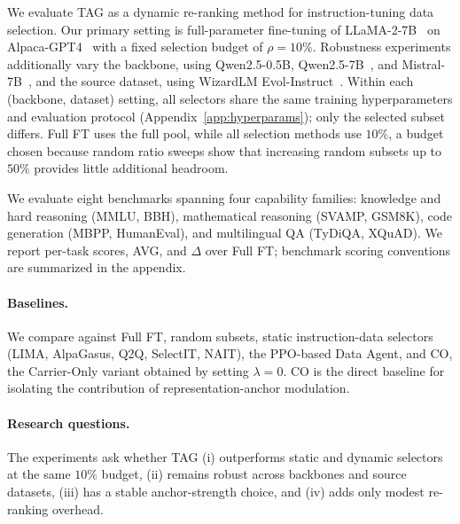 We evaluate \textsc{TAG} as a dynamic re-ranking method for
instruction-tuning data selection. Our primary setting is
full-parameter fine-tuning of LLaMA-2-7B~\cite{touvron2023llama2} on
Alpaca-GPT4~\cite{wang2023selfinstruct} with a fixed selection budget
of \(\rho{=}10\%\). Robustness experiments additionally vary the
backbone, using Qwen2.5-0.5B, Qwen2.5-7B~\cite{qwen2025technical},
and Mistral-7B~\cite{jiang2023mistral}, and the source dataset, using
WizardLM Evol-Instruct~\cite{xu2024wizardlm}. Within each
(backbone, dataset) setting, all selectors share the same training
hyperparameters and evaluation protocol
(Appendix~\ref{app:hyperparams}); only the selected subset
differs. Full FT uses the full pool, while all selection methods use
\(10\%\), a budget chosen because random ratio sweeps show that
increasing random subsets up to \(50\%\) provides little additional
headroom.

We evaluate eight benchmarks spanning four capability families:
knowledge and hard reasoning (MMLU, BBH), mathematical reasoning
(SVAMP, GSM8K), code generation (MBPP, HumanEval), and multilingual QA
(TyDiQA, XQuAD). We report per-task scores, AVG, and \(\Delta\) over
Full FT; benchmark scoring conventions are summarized in the appendix.

\paragraph{Baselines.}
We compare against Full FT, random subsets, static instruction-data
selectors (LIMA, AlpaGasus, Q2Q, SelectIT, NAIT), the PPO-based Data
Agent, and CO, the Carrier-Only variant obtained by setting
\(\lambda{=}0\). CO is the direct baseline for isolating the
contribution of representation-anchor modulation.

\paragraph{Research questions.}
The experiments ask whether \textsc{TAG} (i) outperforms static and
dynamic selectors at the same \(10\%\) budget, (ii) remains robust
across backbones and source datasets, (iii) has a stable
anchor-strength choice, and (iv) adds only modest re-ranking overhead.




